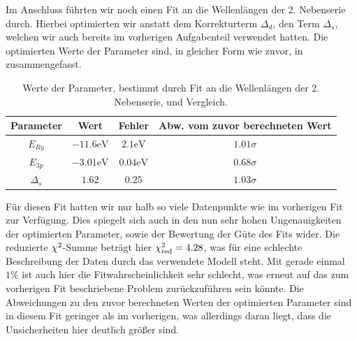 Im Anschluss führten wir noch einen Fit an die Wellenlängen der 2. Nebenserie durch. Hierbei optimierten wir anstatt dem Korrekturterm $\Delta_d$, den Term $\Delta_s$, welchen wir auch bereits im vorherigen Aufgabenteil verwendet hatten. Die optimierten Werte der Parameter sind, in gleicher Form wie zuvor, in  zusammengefasst.

\begin{table}[H]
  \centering
  \caption{Werte der Parameter, bestimmt durch Fit an die Wellenlängen der 2. Nebenserie, und Vergleich.}
  \vspace*{0.5em}
  \begin{tabular}{c c c c}
      \hline
      Parameter & Wert & Fehler & Abw. vom zuvor berechneten Wert \\
      \hline
      $E_{Ry}$  & $-11.6 \si{\electronvolt}$ & $2.1\si{\electronvolt}$ & $1.01\sigma$ \\
      $E_{3p}$  & $-3.01\si{\electronvolt}$  & $0.04\si{\electronvolt}$ & $0.68\sigma$ \\
      $\Delta_{s}$  & $1.62$  & $0.25$ & $1.03\sigma$ \\
      \hline
  \end{tabular}
  \label{tab:fit_2ns_vergl}
\end{table}

Für diesen Fit hatten wir nur halb so viele Datenpunkte wie im vorherigen Fit zur Verfügung. Dies spiegelt sich auch in den nun sehr hohen Ungenauigkeiten der optimierten Parameter, sowie der Bewertung der Güte des Fits wider. Die reduzierte $\chi^{2}$-Summe beträgt hier $\chi^{2}_{\mathrm{red}} = 4.28$, was für eine schlechte Beschreibung der Daten durch das verwendete Modell steht. Mit gerade einmal $1\%$ ist auch hier die Fitwahrscheinlichkeit sehr schlecht, was erneut auf das zum vorherigen Fit beschriebene Problem zurückzuführen sein könnte. Die Abweichungen zu den zuvor berechneten Werten der optimierten Parameter sind in diesem Fit geringer als im vorherigen, was allerdings daran liegt, dass die Unsicherheiten hier deutlich größer sind.